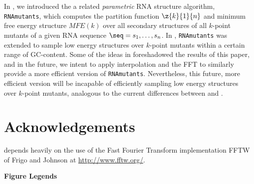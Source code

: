 In \citep{CloWalBehSte05,Waldispuhl.pcb08}, we introduced the a related
{\em parametric} RNA structure algorithm, {\tt RNAmutants}, which computes
the partition function $\z{k}{1}{n}$ and minimum free energy
structure $MFE(k)$ over all secondary structures of all $k$-point mutants
of a given RNA sequence $\seq=s_1,\ldots,s_n$. In  \citep{WaPo2011},
{\tt RNAmutants} was extended to sample low energy structures over
$k$-point mutants within a certain range of GC-content. Some of the ideas
in \citep{WaPo2011} foreshadowed the results of this paper, and in the
future, we intent to apply interpolation and the FFT to similarly provide a
more efficient version of {\tt RNAmutants}. Nevertheless, this future,
more efficient version will be incapable of efficiently sampling low
energy structures over $k$-point mutants, analogous to the current
differences between \rnabor and \fftbor.


\section*{Acknowledgements}

\fftbor depends heavily on the
use of the Fast Fourier Transform implementation FFTW of Frigo and Johnson
\citep{FFTW05} at \url{http://www.fftw.org/}.






\newpage
%

%


\hfill\break
\hfill\break
\newpage

\noindent
{\bf\Large Figure Legends}


